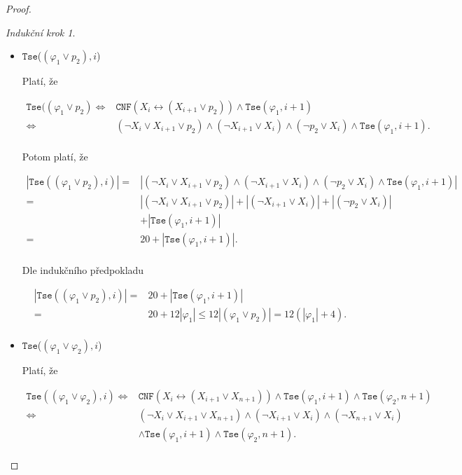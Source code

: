 \documentclass[a4paper, 12pt]{article}
\theoremstyle{definition}
\theoremstyle{definition}
\theoremstyle{definition}
\theoremstyle{remark}
\theoremstyle{remark}
\theoremstyle{remark}
\theoremstyle{remark}
\newtheorem*{inductionstep}{Indukční krok}
\begin{document}
\begin{proof}
\begin{inductionstep}
\begin{itemize}
        \item $\texttt{Tse}$($(\varphi_1 \lor p_2), i$)

        Platí, že

        \begin{align*}
            \texttt{Tse}((\varphi_1 \lor p_2) \Longleftrightarrow &\texttt{CNF}(X_i \leftrightarrow (X_{i+1} \lor p_2)) \wedge \texttt{Tse}(\varphi_1, i + 1) \\
            \Longleftrightarrow &(\neg X_i \lor X_{i+1} \lor p_2) \wedge (\neg X_{i+1} \lor X_i) \wedge (\neg p_2 \lor X_i) \wedge \texttt{Tse}(\varphi_1, i + 1). \\
        \end{align*}

        

        Potom platí, že

        \begin{align*}
            |\texttt{Tse}((\varphi_1 \lor p_2), i)| = &|(\neg X_i \lor X_{i+1} \lor p_2) \wedge (\neg X_{i+1} \lor X_i) \wedge (\neg p_2 \lor X_i) \wedge \texttt{Tse}(\varphi_1, i + 1)| \\
            = & |(\neg X_i \lor X_{i+1} \lor p_2)| + |(\neg X_{i+1} \lor X_i)| + |(\neg p_2 \lor X_i)| \\
            &+ |\texttt{Tse}(\varphi_1, i + 1)| \\
            = &20 + |\texttt{Tse}(\varphi_1, i + 1)|. \\
        \end{align*}

        Dle indukčního předpokladu

        \begin{align*}
            |\texttt{Tse}((\varphi_1 \lor p_2), i)| = &20 + |\texttt{Tse}(\varphi_1, i + 1)| \\
            = &20 + 12|\varphi_1| \leq 12 |(\varphi_1 \lor p_2)| = 12(|\varphi_1| + 4). \\
        \end{align*}
        
        \item $\texttt{Tse}$($(\varphi_1 \lor \varphi_2), i$)

        Platí, že

        \begin{align*}
            \texttt{Tse}((\varphi_1 \lor \varphi_2), i) \Longleftrightarrow &\texttt{CNF}(X_i \leftrightarrow (X_{i+1} \lor X_{n+1})) \wedge \texttt{Tse}(\varphi_1, i + 1) \wedge \texttt{Tse}(\varphi_2, n + 1) \\
            \Longleftrightarrow &(\neg X_i \lor X_{i+1} \lor X_{n+1}) \wedge (\neg X_{i+1} \lor X_i) \wedge (\neg X_{n+1} \lor X_i) \\
            &\wedge \texttt{Tse}(\varphi_1, i + 1) \wedge \texttt{Tse}(\varphi_2, n + 1). \\
        \end{align*}


\end{itemize}
\end{inductionstep}
\end{proof}
\end{document}
